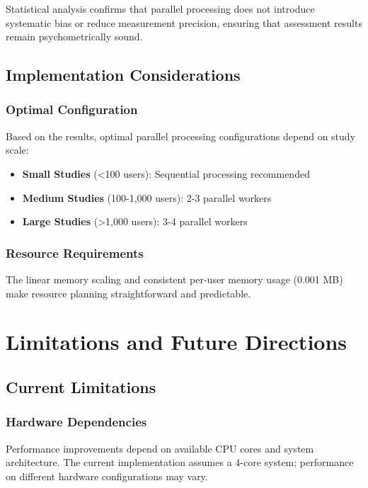 \documentclass[11pt]{article}
\begin{document}
Statistical analysis confirms that parallel processing does not introduce systematic bias or reduce measurement precision, ensuring that assessment results remain psychometrically sound.

\subsection{Implementation Considerations}

\subsubsection{Optimal Configuration}

Based on the results, optimal parallel processing configurations depend on study scale:
\begin{itemize}
\item \textbf{Small Studies} (<100 users): Sequential processing recommended
\item \textbf{Medium Studies} (100-1,000 users): 2-3 parallel workers
\item \textbf{Large Studies} (>1,000 users): 3-4 parallel workers
\end{itemize}

\subsubsection{Resource Requirements}

The linear memory scaling and consistent per-user memory usage (0.001 MB) make resource planning straightforward and predictable.

\section{Limitations and Future Directions}

\subsection{Current Limitations}

\subsubsection{Hardware Dependencies}

Performance improvements depend on available CPU cores and system architecture. The current implementation assumes a 4-core system; performance on different hardware configurations may vary.
\end{document}
